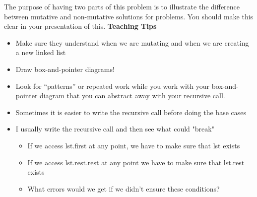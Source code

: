 \begin{parts}
\begin{blocksection}
\begin{solution}[0in]
\end{solution}
\end{blocksection}

\begin{questionmeta}
The purpose of having two parts of this problem is to illustrate the difference between mutative and non-mutative solutions for problems. You should make this clear in your presentation of this. 
\textbf{Teaching Tips}
    \begin{itemize}
        \item Make sure they understand when we are mutating and when we are creating a new linked list
        \item Draw box-and-pointer diagrams!
        \item Look for “patterns” or repeated work while you work with your box-and-pointer diagram that you can abstract away with your recursive call.
        \item Sometimes it is easier to write the recursive call before doing the base cases
        \item I usually write the recursive call and then see what could "break"
        \begin{itemize}
            \item If we access lst.first at any point, we have to make sure that lst exists
            \item If we access lst.rest.rest at any point we have to make sure that lst.rest exists
            \item What errors would we get if we didn't ensure these conditions?
        \end{itemize}
    \end{itemize}
\end{questionmeta}
\end{parts}